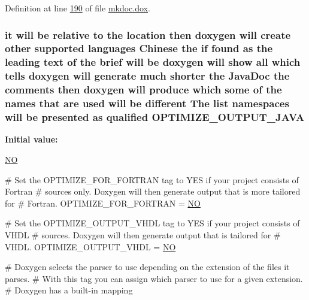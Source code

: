 Definition at line \hyperlink{mkdoc_8dox_source_l00190}{190} of file \hyperlink{mkdoc_8dox_source}{mkdoc.\-dox}.

\hypertarget{mkdoc_8dox_afd2bb55c95bb3cedff4f1baa0d0f09e1}{
\subsubsection[{O\-P\-T\-I\-M\-I\-Z\-E\-\_\-\-O\-U\-T\-P\-U\-T\-\_\-\-J\-A\-V\-A}]{\setlength{\rightskip}{0pt plus 5cm}it will be relative to the location then doxygen will create other supported languages {\bf Chinese} the if found as the leading text of the brief will be doxygen will show all which tells doxygen will generate much shorter the Java\-Doc the comments then doxygen will produce which some of the names that {\bf are} used will be different The list namespaces will be presented as qualified O\-P\-T\-I\-M\-I\-Z\-E\-\_\-\-O\-U\-T\-P\-U\-T\-\_\-\-J\-A\-V\-A}}\label{mkdoc_8dox_afd2bb55c95bb3cedff4f1baa0d0f09e1}
{\bfseries Initial value\-:}
\begin{DoxyCode}
 \hyperlink{mkdoc_8dox_a0f6a46245280dc38baf9600906aa1393}{NO}

\textcolor{preprocessor}{# Set the OPTIMIZE\_FOR\_FORTRAN tag to YES if your project consists of Fortran }
\textcolor{preprocessor}{}\textcolor{preprocessor}{# sources only. Doxygen will then generate output that is more tailored for }
\textcolor{preprocessor}{}\textcolor{preprocessor}{# Fortran.}
\textcolor{preprocessor}{}
OPTIMIZE\_FOR\_FORTRAN   = \hyperlink{mkdoc_8dox_a0f6a46245280dc38baf9600906aa1393}{NO}

\textcolor{preprocessor}{# Set the OPTIMIZE\_OUTPUT\_VHDL tag to YES if your project consists of VHDL }
\textcolor{preprocessor}{}\textcolor{preprocessor}{# sources. Doxygen will then generate output that is tailored for }
\textcolor{preprocessor}{}\textcolor{preprocessor}{# VHDL.}
\textcolor{preprocessor}{}
OPTIMIZE\_OUTPUT\_VHDL   = \hyperlink{mkdoc_8dox_a0f6a46245280dc38baf9600906aa1393}{NO}

\textcolor{preprocessor}{# Doxygen selects the parser to use depending on the extension of the files it
       parses. }
\textcolor{preprocessor}{}\textcolor{preprocessor}{# With this tag you can assign which parser to use for a given extension. }
\textcolor{preprocessor}{# Doxygen has a built-in mapping}
\end{DoxyCode}



